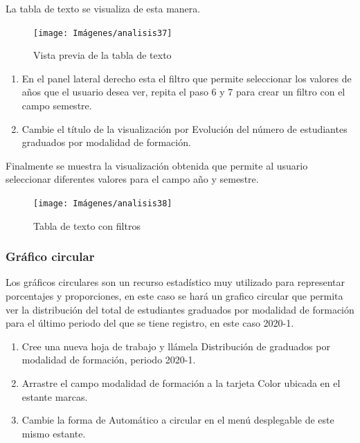 \documentclass[
]{book}
\begin{document}
La tabla de texto se visualiza de esta manera.

\begin{figure}

{\centering \texttt{[image: Imágenes/analisis37]} 

}

\caption{Vista previa de la tabla de texto}\label{fig:paso7-1tablatexto-fig}
\end{figure}

\begin{enumerate}
\def\labelenumi{\arabic{enumi}.}
\setcounter{enumi}{7}
\item
  En el panel lateral derecho esta el filtro que permite seleccionar los valores de años que el usuario desea ver, repita el paso 6 y 7 para crear un filtro con el campo semestre.
\item
  Cambie el título de la visualización por Evolución del número de estudiantes graduados por modalidad de formación.
\end{enumerate}

Finalmente se muestra la visualización obtenida que permite al usuario seleccionar diferentes valores para el campo año y semestre.

\begin{figure}

{\centering \texttt{[image: Imágenes/analisis38]} 

}

\caption{Tabla de texto con filtros}\label{fig:tablatexto-fig}
\end{figure}

\hypertarget{graficocircular}{%
\subsubsection{Gráfico circular}\label{graficocircular}}

Los gráficos circulares son un recurso estadístico muy utilizado para representar porcentajes y proporciones, en este caso se hará un grafico circular que permita ver la distribución del total de estudiantes graduados por modalidad de formación para el último periodo del que se tiene registro, en este caso 2020-1.

\begin{enumerate}
\def\labelenumi{\arabic{enumi}.}
\item
  Cree una nueva hoja de trabajo y llámela Distribución de graduados por modalidad de formación, periodo 2020-1.
\item
  Arrastre el campo modalidad de formación a la tarjeta Color ubicada en el estante marcas.
\item
  Cambie la forma de Automático a circular en el menú desplegable de este mismo estante.
\end{enumerate}
\end{document}
